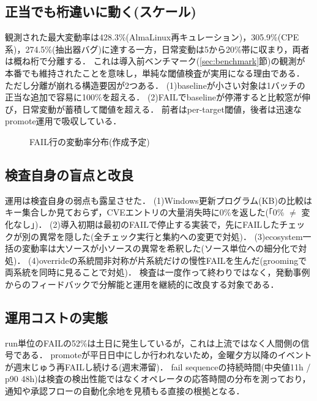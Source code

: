 \documentclass{css}
\begin{document}
\subsection{正当でも桁違いに動く(スケール)}
\label{sec:scaledist}

観測された最大変動率は428.3\%(AlmaLinux再キュレーション)，305.9\%(CPE系)，274.5\%(抽出器バグ)に達する一方，日常変動は5から20\%帯に収まり，両者は概ね桁で分離する．
これは導入前ベンチマーク(\ref{sec:benchmark}節)の観測が本番でも維持されたことを意味し，単純な閾値検査が実用になる理由である．
ただし分離が崩れる構造要因が2つある．
(1)baselineが小さい対象は1バッチの正当な追加で容易に100\%を超える．
(2)FAILでbaselineが停滞すると比較窓が伸び，日常変動が蓄積して閾値を超える．
前者はper-target閾値，後者は迅速なpromote運用で吸収している．

\begin{figure}[tb]
\centering
{}
\caption{FAIL行の変動率分布(作成予定)}
\label{fig:histogram}
\end{figure}

\subsection{検査自身の盲点と改良}
\label{sec:blindspots}

運用は検査自身の弱点も露呈させた．
(1)Windows更新プログラム(KB)の比較はキー集合しか見ておらず，CVEエントリの大量消失時に0\%を返した(「0\% $\neq$ 変化なし」)．
(2)導入初期は最初のFAILで停止する実装で，先にFAILしたチェックが別の異常を隠した(全チェック実行と集約への変更で対処)．
(3)ecosystem一括の変動率は大ソースが小ソースの異常を希釈した(ソース単位への細分化で対処)．
(4)overrideの系統間非対称が片系統だけの慢性FAILを生んだ(groomingで両系統を同時に見ることで対処)．
検査は一度作って終わりではなく，発動事例からのフィードバックで分解能と運用を継続的に改良する対象である．

\subsection{運用コストの実態}
\label{sec:opscost}

run単位のFAILの52\%は土日に発生しているが，これは上流ではなく人間側の信号である．
promoteが平日日中にしか行われないため，金曜夕方以降のイベントが週末じゅう再FAILし続ける(週末滞留)．
fail sequenceの持続時間(中央値11h / p90 48h)は検査の検出性能ではなくオペレータの応答時間の分布を測っており，通知や承認フローの自動化余地を見積もる直接の根拠となる．
\end{document}
